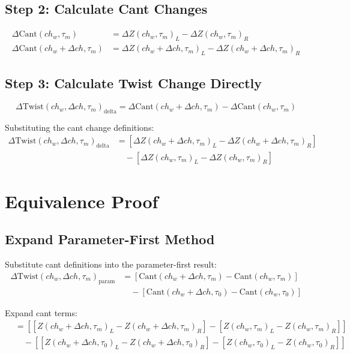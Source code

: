 \documentclass{article}
\begin{document}
\subsection{Step 2: Calculate Cant Changes}
\begin{align}
\Delta\text{Cant}(ch_w, \tau_m) &= \Delta Z(ch_w, \tau_m)_L - \Delta Z(ch_w, \tau_m)_R \\
\Delta\text{Cant}(ch_w + \Delta ch, \tau_m) &= \Delta Z(ch_w + \Delta ch, \tau_m)_L - \Delta Z(ch_w + \Delta ch, \tau_m)_R
\end{align}

\subsection{Step 3: Calculate Twist Change Directly}
\begin{equation}
\Delta\text{Twist}(ch_w, \Delta ch, \tau_m)_{\text{delta}} = \Delta\text{Cant}(ch_w + \Delta ch, \tau_m) - \Delta\text{Cant}(ch_w, \tau_m)
\end{equation}

Substituting the cant change definitions:
\begin{align}
\Delta\text{Twist}(ch_w, \Delta ch, \tau_m)_{\text{delta}} &= [\Delta Z(ch_w + \Delta ch, \tau_m)_L - \Delta Z(ch_w + \Delta ch, \tau_m)_R] \nonumber \\
&\quad - [\Delta Z(ch_w, \tau_m)_L - \Delta Z(ch_w, \tau_m)_R]
\end{align}

\section{Equivalence Proof}

\subsection{Expand Parameter-First Method}
Substitute cant definitions into the parameter-first result:
\begin{align}
\Delta\text{Twist}(ch_w, \Delta ch, \tau_m)_{\text{param}} &= [\text{Cant}(ch_w + \Delta ch, \tau_m) - \text{Cant}(ch_w, \tau_m)] \nonumber \\
&\quad - [\text{Cant}(ch_w + \Delta ch, \tau_0) - \text{Cant}(ch_w, \tau_0)]
\end{align}

Expand cant terms:
\begin{align}
&= [[Z(ch_w + \Delta ch, \tau_m)_L - Z(ch_w + \Delta ch, \tau_m)_R] - [Z(ch_w, \tau_m)_L - Z(ch_w, \tau_m)_R]] \nonumber \\
&\quad - [[Z(ch_w + \Delta ch, \tau_0)_L - Z(ch_w + \Delta ch, \tau_0)_R] - [Z(ch_w, \tau_0)_L - Z(ch_w, \tau_0)_R]]
\end{align}
\end{document}
